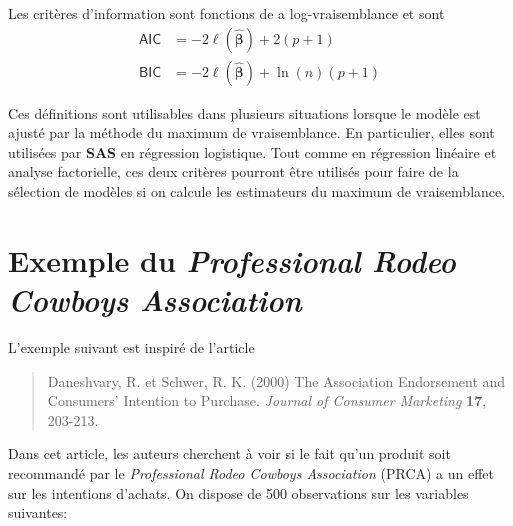 \documentclass[
  11pt,
  letterpaper,
]{book}
\theoremstyle{definition}
\theoremstyle{definition}
\theoremstyle{definition}
\theoremstyle{remark}
\begin{document}
Les critères d'information sont fonctions de a log-vraisemblance et sont
\begin{align*}
 \mathsf{AIC} & = -2 \ell(\widehat{\boldsymbol{\beta}}) + 2(p+1)\\
 \mathsf{BIC} & = -2 \ell(\widehat{\boldsymbol{\beta}}) + \ln(n)(p+1)
\end{align*}

Ces définitions sont utilisables dans plusieurs situations lorsque le modèle est ajusté par la méthode du maximum de vraisemblance. En particulier, elles sont utilisées par \textbf{SAS} en régression logistique. Tout comme en régression linéaire et analyse factorielle, ces deux critères pourront être utilisés pour faire de la sélection de modèles si on calcule les estimateurs du maximum de vraisemblance.

\hypertarget{cowboy}{%
\section{\texorpdfstring{Exemple du \emph{Professional Rodeo Cowboys Association}}{Exemple du Professional Rodeo Cowboys Association}}\label{cowboy}}

L'exemple suivant est inspiré de l'article

\begin{quote}
Daneshvary, R. et Schwer, R. K. (2000) The Association Endorsement and Consumers' Intention to Purchase. \emph{Journal of Consumer Marketing} \textbf{17}, 203-213.
\end{quote}

Dans cet article, les auteurs cherchent à voir si le fait qu'un produit soit recommandé par le \emph{Professional Rodeo Cowboys Association} (PRCA) a un effet sur les intentions d'achats. On dispose de 500 observations sur les variables suivantes:
\end{document}
